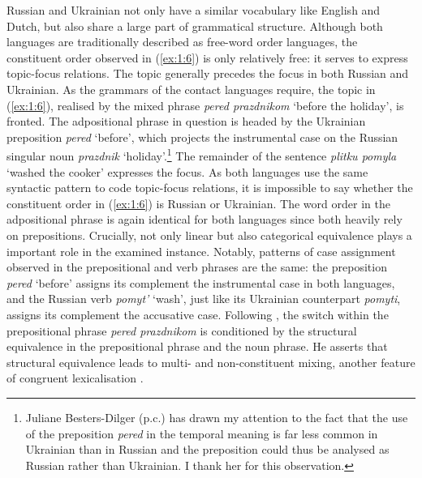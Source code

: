 \noindent Russian and Ukrainian not only have a similar vocabulary like English and Dutch, but also share a large part of grammatical structure. Although both languages are traditionally described as free-word order languages, the constituent order observed in (\ref{ex:1:6}) is only relatively free: it serves to express  topic-focus relations. The topic generally precedes the focus in both Russian and Ukrainian. As the grammars of the contact languages require, the topic in (\ref{ex:1:6}), realised by the mixed phrase \textit{pered prazdnikom} 
`before the holiday', is fronted. The adpositional phrase in question is headed by the Ukrainian preposition \textit{pered}  `before', which projects the instrumental case on the Russian singular noun \textit{prazdnik} `holiday'.\footnote{Juliane Besters-Dilger (p.c.) has drawn my attention to the fact that the use of the preposition \textit{pered} in the temporal meaning is far less common in Ukrainian than in Russian and the preposition could thus be analysed as Russian rather than Ukrainian. I thank her for this observation.} The remainder of the sentence \textit{plitku pomyla} `washed the cooker' expresses the focus. As both languages use the same syntactic pattern to code topic-focus relations, it is impossible to say whether the constituent order in (\ref{ex:1:6}) is Russian or Ukrainian. The word order in the adpositional phrase is again identical for both languages since both heavily rely on prepositions. Crucially, not only linear but also categorical equivalence plays a important role in the examined instance. Notably, patterns of case assignment observed in the prepositional and verb phrases are the same: the preposition \textit{pered} `before' assigns its complement the instrumental case in both languages, and the Russian verb \textit{pomyt'} `wash', just like its Ukrainian counterpart \textit{pomyti}, assigns its complement the accusative case. Following \citet[129]{muysken-bilingual-2000}, the switch within the prepositional phrase \textit{pered prazdnikom} is conditioned by the structural equivalence in the prepositional phrase and the noun phrase. He asserts that structural equivalence leads to multi- and non-constituent mixing, another feature of congruent lexicalisation \citep[129]{muysken-bilingual-2000}. 

